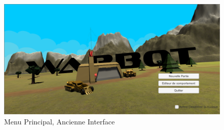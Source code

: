 \documentclass{report}
\begin{document}
\begin{figure}[!h]
	\centering
		\includegraphics[scale=0.50]{MainScreenOld}
	\caption{Menu Principal, Ancienne Interface}
\end{figure}
\end{document}
